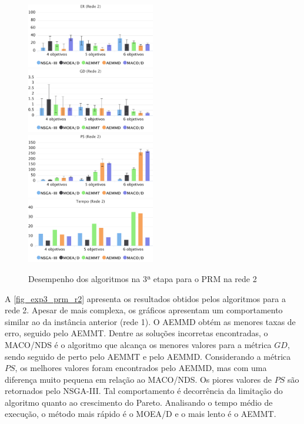 \begin{figure}[!htbp]	
	\includegraphics[width=0.5\textwidth]{cap_experimentos/figs/etapa3/er-mrp-r2}
	\includegraphics[width=0.5\textwidth]{cap_experimentos/figs/etapa3/gd-mrp-r2}
	\includegraphics[width=0.5\textwidth]{cap_experimentos/figs/etapa3/ps-mrp-r2}
	\includegraphics[width=0.5\textwidth]{cap_experimentos/figs/etapa3/time-mrp-r2}
	\caption{\label{fig_exp3_prm_r2}Desempenho dos algoritmos na 3ª etapa para o PRM na rede 2}
\end{figure}

A \autoref{fig_exp3_prm_r2} apresenta os resultados obtidos pelos algoritmos para a rede 2. Apesar de mais complexa, os gráficos apresentam um comportamento similar ao da instância anterior (rede 1). O AEMMD obtém as menores taxas de erro, seguido pelo AEMMT. Dentre as soluções incorretas encontradas, o MACO/NDS é o algoritmo que alcança os menores valores para a métrica $GD$, sendo seguido de perto pelo AEMMT e pelo AEMMD. Considerando a métrica $PS$, os melhores valores foram encontrados pelo AEMMD, mas com uma diferença muito pequena em relação ao MACO/NDS. Os piores valores de $PS$ são retornados pelo NSGA-III. Tal comportamento é decorrência da limitação do algoritmo quanto ao crescimento do Pareto. Analisando o tempo médio de execução, o método mais rápido é o MOEA/D e o mais lento é o AEMMT.

